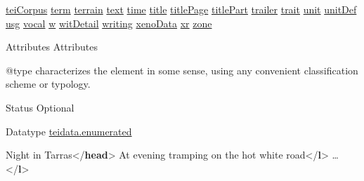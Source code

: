 \begin{reflist}
\hyperref[TEI.teiCorpus]{teiCorpus} \hyperref[TEI.term]{term} \hyperref[TEI.terrain]{terrain} \hyperref[TEI.text]{text} \hyperref[TEI.time]{time} \hyperref[TEI.title]{title} \hyperref[TEI.titlePage]{titlePage} \hyperref[TEI.titlePart]{titlePart} \hyperref[TEI.trailer]{trailer} \hyperref[TEI.trait]{trait} \hyperref[TEI.unit]{unit} \hyperref[TEI.unitDef]{unitDef} \hyperref[TEI.usg]{usg} \hyperref[TEI.vocal]{vocal} \hyperref[TEI.w]{w} \hyperref[TEI.witDetail]{witDetail} \hyperref[TEI.writing]{writing} \hyperref[TEI.xenoData]{xenoData} \hyperref[TEI.xr]{xr} \hyperref[TEI.zone]{zone}
    \item[{Attributes}]
  Attributes\hfil\\[-10pt]\begin{sansreflist}
    \item[@type]
  characterizes the element in some sense, using any convenient classification scheme or typology.
\begin{reflist}
    \item[{Status}]
  Optional
    \item[{Datatype}]
  \hyperref[TEI.teidata.enumerated]{teidata.enumerated}
    \item[]\mbox{}\newline 
{}Night in Tarras{</\textbf{head}>}\mbox{}\newline 
{}\mbox{}\newline 
\hspace*{1em}At evening tramping on the hot white road{</\textbf{l}>}\mbox{}\newline 
\hspace*{1em}…{</\textbf{l}>}\mbox{}\newline 
{}\mbox{}\newline 

\end{reflist}
\end{sansreflist}
\end{reflist}
